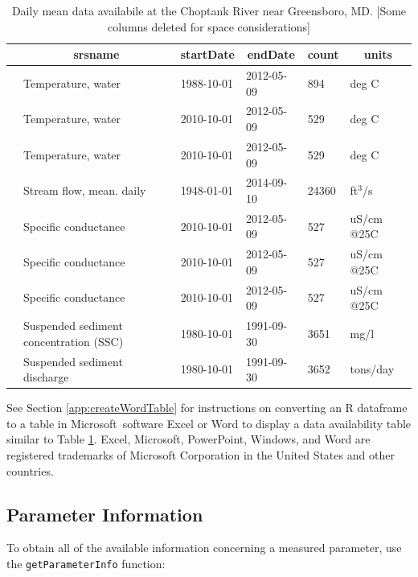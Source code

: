 \documentclass[a4paper,11pt]{article}\usepackage[]{graphicx}\usepackage[]{color}
\begin{document}
\begin{table}[ht]
\caption{Daily mean data availabile at the Choptank River near Greensboro, MD. [Some columns deleted for space considerations]} 
\label{tab:gda}
{\footnotesize
\begin{tabular}{rlllll}
  \hline
 & \multicolumn{1}{c}{\textbf{\textsf{srsname}}} & \multicolumn{1}{c}{\textbf{\textsf{startDate}}} & \multicolumn{1}{c}{\textbf{\textsf{endDate}}} & \multicolumn{1}{c}{\textbf{\textsf{count}}} & \multicolumn{1}{c}{\textbf{\textsf{units}}} \\ 
  \hline
 & Temperature, water & 1988-10-01 & 2012-05-09 & 894 & deg C \\ 
  [5pt] & Temperature, water & 2010-10-01 & 2012-05-09 & 529 & deg C \\ 
  [5pt] & Temperature, water & 2010-10-01 & 2012-05-09 & 529 & deg C \\ 
  [5pt] & Stream flow, mean. daily & 1948-01-01 & 2014-09-10 & 24360 & ft$^3$/s \\ 
  [5pt] & Specific conductance & 2010-10-01 & 2012-05-09 & 527 & uS/cm @25C \\ 
  [5pt] & Specific conductance & 2010-10-01 & 2012-05-09 & 527 & uS/cm @25C \\ 
  [5pt] & Specific conductance & 2010-10-01 & 2012-05-09 & 527 & uS/cm @25C \\ 
  [5pt] & Suspended sediment concentration (SSC) & 1980-10-01 & 1991-09-30 & 3651 & mg/l \\ 
  [5pt] & Suspended sediment discharge & 1980-10-01 & 1991-09-30 & 3652 & tons/day \\ 
   \hline
\end{tabular}
}
\end{table}


See Section \ref{app:createWordTable} for instructions on converting an R dataframe to a table in Microsoft\textregistered\ software Excel or Word to display a data availability table similar to Table \ref{tab:gda}. Excel, Microsoft, PowerPoint, Windows, and Word are registered trademarks of Microsoft Corporation in the United States and other countries.

\FloatBarrier

\subsection{Parameter Information}
\label{sec:usgsParams}
To obtain all of the available information concerning a measured parameter, use the \texttt{getParameterInfo} function:
\end{document}
